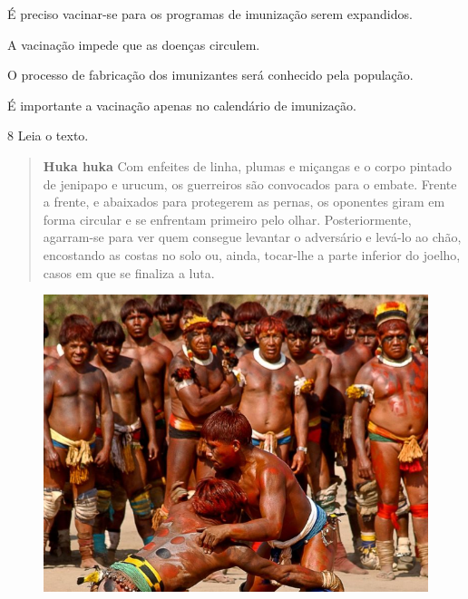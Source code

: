 \begin{escolha}
\item É preciso vacinar-se para os programas de imunização serem expandidos.

\item A vacinação impede que as doenças circulem.

\item O processo de fabricação dos imunizantes será conhecido pela população.

\item É importante a vacinação apenas no calendário de imunização.
\end{escolha}


\num{8}  Leia o texto.

\begin{quote}
\textbf{Huka huka}
Com enfeites de linha, plumas e miçangas e o corpo pintado de jenipapo e
urucum, os guerreiros são convocados para o embate. Frente a frente, e
abaixados para protegerem as pernas, os oponentes
giram em forma circular e se enfrentam primeiro pelo olhar.
Posteriormente, agarram-se para ver quem consegue levantar o adversário
e levá-lo ao chão, encostando as costas no solo ou, ainda, tocar-lhe a
parte inferior do joelho, casos em que se finaliza a luta.
\end{quote}

\begin{figure}[htpb!]
\includegraphics[width=\textwidth]{./imgs/art36.png}
\end{figure}

